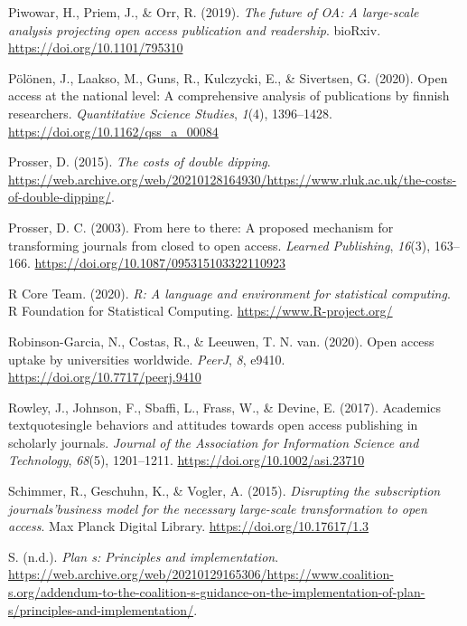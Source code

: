 \documentclass[a4paper,man,floatsintext,longtable,noextraspace,12pt]{apa6}
\newlength{\cslhangindent}
\newenvironment{cslreferences}%
  {\setlength{\parindent}{0pt}%
  \everypar{\setlength{\hangindent}{\cslhangindent}}\ignorespaces}%
  {\par}
\begin{document}
\begin{cslreferences}
\leavevmode\hypertarget{ref-Piwowar_2019}{}%
Piwowar, H., Priem, J., \& Orr, R. (2019). \emph{The future of OA: A
large-scale analysis projecting open access publication and readership}.
bioRxiv. \url{https://doi.org/10.1101/795310}

\leavevmode\hypertarget{ref-P_l_nen_2020}{}%
Pölönen, J., Laakso, M., Guns, R., Kulczycki, E., \& Sivertsen, G.
(2020). Open access at the national level: A comprehensive analysis of
publications by finnish researchers. \emph{Quantitative Science
Studies}, \emph{1}(4), 1396--1428.
\url{https://doi.org/10.1162/qss_a_00084}

\leavevmode\hypertarget{ref-Prosser_2015}{}%
Prosser, D. (2015). \emph{The costs of double dipping}.
\url{https://web.archive.org/web/20210128164930/https://www.rluk.ac.uk/the-costs-of-double-dipping/}.

\leavevmode\hypertarget{ref-Prosser_2003}{}%
Prosser, D. C. (2003). From here to there: A proposed mechanism for
transforming journals from closed to open access. \emph{Learned
Publishing}, \emph{16}(3), 163--166.
\url{https://doi.org/10.1087/095315103322110923}

\leavevmode\hypertarget{ref-r}{}%
R Core Team. (2020). \emph{R: A language and environment for statistical
computing}. R Foundation for Statistical Computing.
\url{https://www.R-project.org/}

\leavevmode\hypertarget{ref-Robinson_Garcia_2020}{}%
Robinson-Garcia, N., Costas, R., \& Leeuwen, T. N. van. (2020). Open
access uptake by universities worldwide. \emph{PeerJ}, \emph{8}, e9410.
\url{https://doi.org/10.7717/peerj.9410}

\leavevmode\hypertarget{ref-Rowley_2017}{}%
Rowley, J., Johnson, F., Sbaffi, L., Frass, W., \& Devine, E. (2017).
Academics\\
textquotesingle behaviors and attitudes towards open access publishing
in scholarly journals. \emph{Journal of the Association for Information
Science and Technology}, \emph{68}(5), 1201--1211.
\url{https://doi.org/10.1002/asi.23710}

\leavevmode\hypertarget{ref-Schimmer_2015}{}%
Schimmer, R., Geschuhn, K., \& Vogler, A. (2015). \emph{Disrupting the
subscription journals'business model for the necessary large-scale
transformation to open access}. Max Planck Digital Library.
\url{https://doi.org/10.17617/1.3}

\leavevmode\hypertarget{ref-Plan_s}{}%
S. (n.d.). \emph{Plan s: Principles and implementation}.
\url{https://web.archive.org/web/20210129165306/https://www.coalition-s.org/addendum-to-the-coalition-s-guidance-on-the-implementation-of-plan-s/principles-and-implementation/}.


\end{cslreferences}
\end{document}
